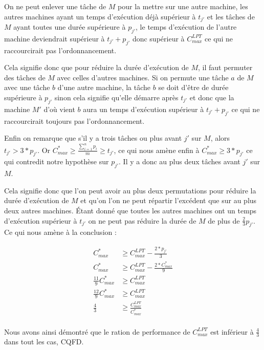 On ne peut enlever une tâche de $M$ pour la mettre sur une autre machine, les 
autres machines ayant un temps d'exécution déjà supérieur à $t_{j'}$ et les 
tâches de $M$ ayant toutes une durée supérieure à $p_{j'}$, le temps d'exécution 
de l'autre machine deviendrait supérieur à $t_{j'}+p_{j'}$ donc supérieur 
à $C^{LPT}_{max}$ ce qui ne raccourcirait pas l'ordonnancement.

Cela signifie donc que pour réduire la durée d'exécution de $M$, il faut 
permuter des tâches de $M$ avec celles d'autres machines. Si on permute une 
tâche $a$ de $M$ avec une tâche $b$ d'une autre machine, la tâche $b$ se doit 
d'être de durée supérieure à $p_{j'}$ sinon cela signifie qu'elle démarre 
après $t_{j'}$ et donc que la machine $M'$ d'où vient $b$ aura un temps 
d'exécution supérieur à $t_{j'}+p_{j'}$ ce qui ne raccourcirait toujours pas 
l'ordonnancement.

Enfin on remarque que s'il y a trois tâches ou plus avant $j'$ sur $M$, alors 
$t_{j'} > 3*p_{j'}$. Or $C^*_{max} \geq \frac{\sum_{i=1}^n p_{i}}{m} \geq 
t_{j'}$, ce qui nous amène enfin à $C^*_{max} \geq 3*p_{j'}$ ce qui contredit 
notre hypothèse sur $p_{j'}$.  Il y a donc au plus deux tâches avant $j'$ sur 
$M$.

Cela signifie donc que l'on peut avoir au plus deux permutations pour réduire la 
durée d'exécution de $M$ et qu'on l'on ne peut répartir l'excédent que sur au 
plus deux autres machines. Étant donné que toutes les autres machines ont un 
temps d'exécution supérieur à $t_{j'}$ on ne peut pas réduire la durée de $M$ de 
plus de $\frac{2}{3}p_{j'}$. Ce qui nous amène à la conclusion :

\begin{align}
C^*_{max} &\geq C^{LPT}_{max} - \frac{2*p_{j'}}{3} \\
C^*_{max} &\geq C^{LPT}_{max} - \frac{2*C^*_{max}}{9} \\
\frac{11}{9}C^*_{max} &\geq C^{LPT}_{max} \\
\frac{12}{9}C^*_{max} &\geq C^{LPT}_{max} \\
\frac{4}{3} &\geq \frac{C^{LPT}_{max}}{C^*_{max}} \\
\end{align}

Nous avons ainsi démontré que le ration de performance de $C^{LPT}_{max}$ est 
inférieur à $\frac{4}{3}$ dans tout les cas, CQFD.
